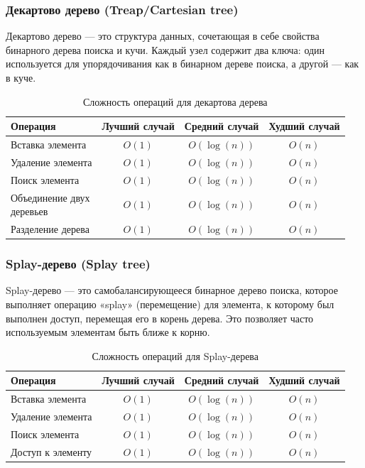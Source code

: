 \documentclass[a4paper,12pt]{article}
\begin{document}
\subsubsection{Декартово дерево (Treap/Cartesian tree)}
\label{subsubsec:декартово-дерево-treapcartesian-tree}

Декартово дерево --- это структура данных, сочетающая в себе свойства бинарного дерева поиска и кучи. Каждый узел содержит два ключа: один используется для упорядочивания как в бинарном дереве поиска, а другой --- как в куче.

\begin{table}[H]
    \centering
    \begin{tabular}{|l|c|c|c|}
        \hline
        Операция & Лучший случай & Средний случай & Худший случай \\
        \hline
        Вставка элемента & $O(1)$ & $O(\log(n))$ & $O(n)$ \\
        \hline
        Удаление элемента & $O(1)$ & $O(\log(n))$ & $O(n)$ \\
        \hline
        Поиск элемента & $O(1)$ & $O(\log(n))$ & $O(n)$ \\
        \hline
        \makecell[l]{Объединение двух \\деревьев} & $O(1)$ & $O(\log(n))$ & $O(n)$ \\
        \hline
        Разделение дерева & $O(1)$ & $O(\log(n))$ & $O(n)$ \\
        \hline
    \end{tabular}
    \caption{Сложность операций для декартова дерева}
\end{table}

\subsubsection{Splay-дерево (Splay tree)}
\label{subsubsec:splay-дерево-splay-tree}

Splay-дерево --- это самобалансирующееся бинарное дерево поиска, которое выполняет операцию «splay» (перемещение) для элемента, к которому был выполнен доступ, перемещая его в корень дерева. Это позволяет часто используемым элементам быть ближе к корню.

\begin{table}[H]
    \centering
    \begin{tabular}{|l|c|c|c|}
        \hline
        Операция & Лучший случай & Средний случай & Худший случай \\
        \hline
        Вставка элемента & $O(1)$ & $O(\log(n))$ & $O(n)$ \\
        \hline
        Удаление элемента & $O(1)$ & $O(\log(n))$ & $O(n)$ \\
        \hline
        Поиск элемента & $O(1)$ & $O(\log(n))$ & $O(n)$ \\
        \hline
        Доступ к элементу & $O(1)$ & $O(\log(n))$ & $O(n)$ \\
        \hline
    \end{tabular}
    \caption{Сложность операций для Splay-дерева}
\end{table}
\end{document}
